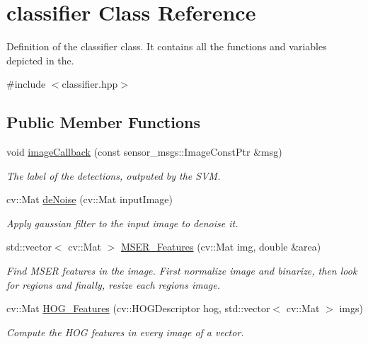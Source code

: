 \hypertarget{classclassifier}{}\section{classifier Class Reference}
\label{classclassifier}


Definition of the classifier class. It contains all the functions and variables depicted in the.  




{\ttfamily \#include $<$classifier.\+hpp$>$}

\subsection*{Public Member Functions}
\begin{DoxyCompactItemize}
\item 
void \hyperlink{classclassifier_a08655fcec6411365a3838ac7c9cd2b19}{image\+Callback} (const sensor\+\_\+msgs\+::\+Image\+Const\+Ptr \&msg)
\begin{DoxyCompactList}\small\item\em The label of the detections, outputed by the S\+VM. \end{DoxyCompactList}\item 
cv\+::\+Mat \hyperlink{classclassifier_a8a7a42fa1bb806e639d23493d5c222d8}{de\+Noise} (cv\+::\+Mat input\+Image)
\begin{DoxyCompactList}\small\item\em Apply gaussian filter to the input image to denoise it. \end{DoxyCompactList}\item 
std\+::vector$<$ cv\+::\+Mat $>$ \hyperlink{classclassifier_a5b5bd9ecfd7fd622b742ee31fafd2f93}{M\+S\+E\+R\+\_\+\+Features} (cv\+::\+Mat img, double \&area)
\begin{DoxyCompactList}\small\item\em Find M\+S\+ER features in the image. First normalize image and binarize, then look for regions and finally, resize each regions image. \end{DoxyCompactList}\item 
cv\+::\+Mat \hyperlink{classclassifier_a162fa849e75034ee7e86b1081de8f3c3}{H\+O\+G\+\_\+\+Features} (cv\+::\+H\+O\+G\+Descriptor hog, std\+::vector$<$ cv\+::\+Mat $>$ imgs)
\begin{DoxyCompactList}\small\item\em Compute the H\+OG features in every image of a vector. \end{DoxyCompactList}\item 

\end{DoxyCompactItemize}
